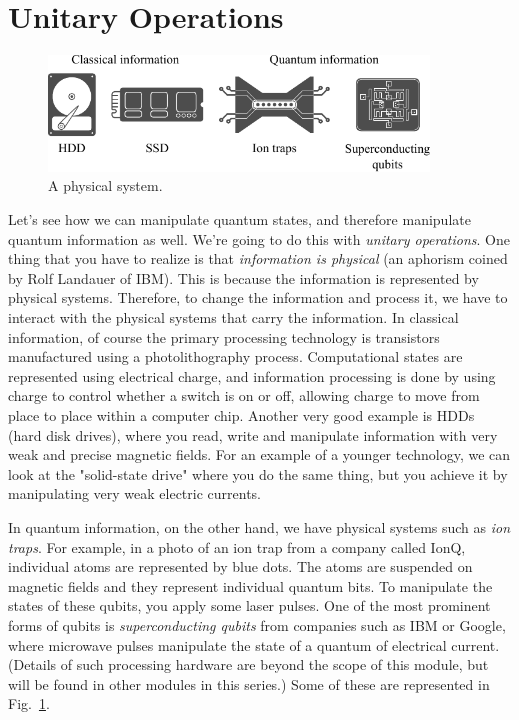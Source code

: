 \section{Unitary Operations}


\begin{figure}[H]
    \centering
    \includegraphics[width=0.9\textwidth]{lesson2/2-2_classical_quantum_info.pdf}
        \caption{A physical system.}
    \label{fig:physical-system}
\end{figure}

Let's see how we can manipulate quantum states, and therefore manipulate quantum information as well. We're going to do this with \emph{unitary operations}. One thing that you have to realize is that \emph{information is physical} (an aphorism coined by Rolf Landauer of IBM). This is because the information is represented by physical systems. Therefore, to change the information and process it, we have to interact with the physical systems that carry the information. In classical information, of course the primary processing technology is transistors manufactured using a photolithography process.  Computational states are represented using electrical charge, and information processing is done by using charge to control whether a switch is on or off, allowing charge to move from place to place within a computer chip.  Another very good example is HDDs (hard disk drives), where you read, write and manipulate information with very weak and precise magnetic fields. For an example of a younger technology, we can look at the "solid-state drive" where you do the same thing, but you achieve it by manipulating very weak electric currents.

In quantum information, on the other hand, we have physical systems such as \emph{ion traps}. For example, in a photo of an ion trap from a company called IonQ, individual atoms are represented by blue dots. The atoms are suspended on magnetic fields and they represent individual quantum bits. To manipulate the states of these qubits, you apply some laser pulses.  One of the most prominent forms of qubits is \emph{superconducting qubits} from companies such as IBM or Google, where microwave pulses manipulate the state of a quantum of electrical current. (Details of such processing hardware are beyond the scope of this module, but will be found in other modules in this series.) Some of these are represented in Fig.~\ref{fig:physical-system}.

